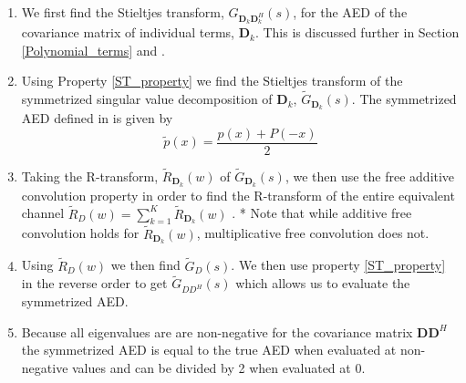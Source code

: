 \documentclass[12pt,a4paper]{article}
\begin{document}
\begin{enumerate}


\item 
	We first find the Stieltjes transform, $G_{\mathbf{D}_{k}\mathbf{D}_{k}^H}(s)$, for the AED of the 
	covariance matrix of individual terms, $\mathbf{D}_{k}$.
	This is discussed further in Section \ref{Polynomial_terms} and \cite[Section II]{muller2002asymptotic}.
\item
	Using Property \ref{ST_property} we find the Stieltjes transform of the symmetrized 
	singular value decomposition of $\mathbf{D}_{k}$, $\tilde{G}_{\mathbf{D}_{k}}(s)$. The symmetrized AED defined 
	in \cite[Eqn. 38]{muller2012channel} is given by 
	\begin{equation}
	\tilde{p}(x) = \frac{p(x)+P(-x)}{2}
	\end{equation}
\item
	Taking the R-transform, $\tilde{R}_{\mathbf{D}_{k}}(w)$ of $\tilde{G}_{\mathbf{D}_{k}}(s)$, we then use the free additive convolution property in order to 
	find the R-transform of the entire equivalent channel $\tilde{R}_{D}(w) = \sum_{k=1}^{K} \tilde{R}_{\mathbf{D}_{k}}(w) $ . 
	* Note that while additive free convolution holds for $\tilde{R}_{\mathbf{D}_{k}}(w)$, multiplicative free convolution does
	 not.
\item
	Using $\tilde{R}_{D}(w)$ we then find $\tilde{G}_{D}(s)$. We then use property \eqref{ST_property} in the reverse
	 order to get $\tilde{G}_{DD^H}(s)$  which allows us to evaluate the  symmetrized AED.

\item 
	Because all eigenvalues are are non-negative for the covariance matrix $\mathbf{D}\mathbf{D}^H$
	the symmetrized AED is equal to the true AED when evaluated at non-negative values and can be divided by 2
	when evaluated at 0. 

\end{enumerate}
\end{document}
